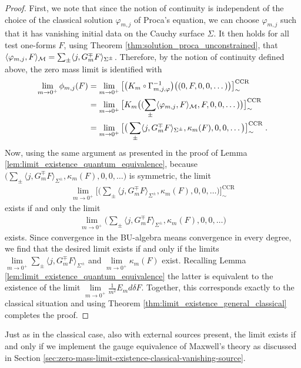 \begin{proof}
	First, we note that since the notion of continuity is independent of the choice of the classical solution $\varphi_{m,j}$ of Proca's equation, we can choose $\varphi_{m,j}$ such that it has vanishing initial data on the Cauchy surface $\Sigma$. It then holds for all test one-forms $F$, using Theorem \ref{thm:solution_proca_unconstrained}, that $\langle \varphi_{m,j} , F \rangle_{\mathcal{M}} = \sum_{\pm}\langle j , G_m^\mp F \rangle_{\Sigma^\pm}$. Therefore, by the notion of continuity defined above, the zero mass limit is identified with
	\begin{align}
	\lim\limits_{m \to 0^+}  \phi_{m,j}(F)
	&= \lim\limits_{m \to 0^+} \big[\big( K_m \comp \Gamma^{-1}_{m,j,\varphi} \big)\big(  (0,F,0,0,\dots)   \big)\big]^\text{CCR}_\sim \notag \\
	&= \lim\limits_{m \to 0^+} \big[K_m \big(  (\sum_{\pm} \langle \varphi_{m,j} , F \rangle_\M,F,0,0,\dots)   \big)\big]^\text{CCR}_\sim 	    \notag\\
	&= \lim\limits_{m \to 0^+} \big[\big( \sum_{\pm} \langle j , G_m^\mp F \rangle_{\Sigma^\pm} , \kappa_m(F) , 0 , 0, \dots\big)\big]^\text{CCR}_\sim  \formspace.
	\end{align}
Now, using the same argument as presented in the proof of Lemma \ref{lem:limit_existence_quantum_equivalence}, because $\big( \sum_{\pm} \langle j , G_m^\mp F \rangle_{\Sigma^\pm} , \kappa_m(F) , 0 , 0, \dots\big)$ is symmetric, the limit
\begin{align}
\lim\limits_{m \to 0^+} \big[\big( \sum_{\pm} \langle j , G_m^\mp F \rangle_{\Sigma^\pm} , \kappa_m(F) , 0 , 0, \dots\big)\big]^\text{CCR}_\sim
\end{align} exists if and only the limit
\begin{align}
\lim\limits_{m \to 0^+} \big( \sum_{\pm} \langle j , G_m^\mp F \rangle_{\Sigma^\pm} , \kappa_m(F) , 0 , 0, \dots\big)
\end{align}
exists.
	Since convergence in the BU-algebra means convergence in every degree, we find that the desired limit exists if and only if the limits $\lim\limits_{m \to 0^+}\sum_{\pm} \langle j , G_m^\mp F \rangle_{\Sigma^\pm}$ and $\lim\limits_{m \to 0^+} \kappa_m(F) $ exist. Recalling Lemma \ref{lem:limit_existence_quantum_equivalence} the latter is equivalent to the existence of the limit $\lim\limits_{m \to 0^+} \frac{1}{m^2}E_m d \delta F$. Together, this corresponds exactly to the classical situation and using Theorem \ref{thm:limit_existence_general_classical} completes the proof.
\end{proof}
Just as in the classical case, also with external sources present, the limit exists if and only if we implement the gauge equivalence of Maxwell's theory as discussed in Section \ref{sec:zero-mass-limit-existence-classical-vanishing-source}.
%
%
%
%
%
%
%
%
%
